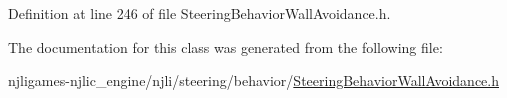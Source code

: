 Definition at line 246 of file Steering\+Behavior\+Wall\+Avoidance.\+h.



The documentation for this class was generated from the following file\+:\begin{DoxyCompactItemize}
\item 
njligames-\/njlic\+\_\+engine/njli/steering/behavior/\mbox{\hyperlink{_steering_behavior_wall_avoidance_8h}{Steering\+Behavior\+Wall\+Avoidance.\+h}}\end{DoxyCompactItemize}
